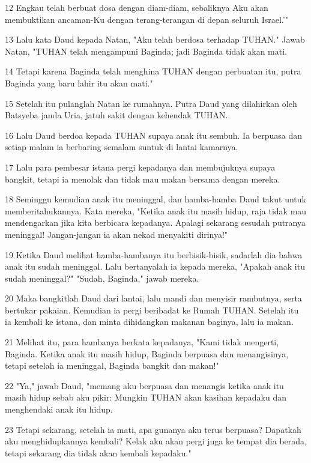 \par 12 Engkau telah berbuat dosa dengan diam-diam, sebaliknya Aku akan membuktikan ancaman-Ku dengan terang-terangan di depan seluruh Israel.'"
\par 13 Lalu kata Daud kepada Natan, "Aku telah berdosa terhadap TUHAN." Jawab Natan, "TUHAN telah mengampuni Baginda; jadi Baginda tidak akan mati.
\par 14 Tetapi karena Baginda telah menghina TUHAN dengan perbuatan itu, putra Baginda yang baru lahir itu akan mati."
\par 15 Setelah itu pulanglah Natan ke rumahnya. Putra Daud yang dilahirkan oleh Batsyeba janda Uria, jatuh sakit dengan kehendak TUHAN.
\par 16 Lalu Daud berdoa kepada TUHAN supaya anak itu sembuh. Ia berpuasa dan setiap malam ia berbaring semalam suntuk di lantai kamarnya.
\par 17 Lalu para pembesar istana pergi kepadanya dan membujuknya supaya bangkit, tetapi ia menolak dan tidak mau makan bersama dengan mereka.
\par 18 Seminggu kemudian anak itu meninggal, dan hamba-hamba Daud takut untuk memberitahukannya. Kata mereka, "Ketika anak itu masih hidup, raja tidak mau mendengarkan jika kita berbicara kepadanya. Apalagi sekarang sesudah putranya meninggal! Jangan-jangan ia akan nekad menyakiti dirinya!"
\par 19 Ketika Daud melihat hamba-hambanya itu berbisik-bisik, sadarlah dia bahwa anak itu sudah meninggal. Lalu bertanyalah ia kepada mereka, "Apakah anak itu sudah meninggal?" "Sudah, Baginda," jawab mereka.
\par 20 Maka bangkitlah Daud dari lantai, lalu mandi dan menyisir rambutnya, serta bertukar pakaian. Kemudian ia pergi beribadat ke Rumah TUHAN. Setelah itu ia kembali ke istana, dan minta dihidangkan makanan baginya, lalu ia makan.
\par 21 Melihat itu, para hambanya berkata kepadanya, "Kami tidak mengerti, Baginda. Ketika anak itu masih hidup, Baginda berpuasa dan menangisinya, tetapi setelah ia meninggal, Baginda bangkit dan makan!"
\par 22 "Ya," jawab Daud, "memang aku berpuasa dan menangis ketika anak itu masih hidup sebab aku pikir: Mungkin TUHAN akan kasihan kepadaku dan menghendaki anak itu hidup.
\par 23 Tetapi sekarang, setelah ia mati, apa gunanya aku terus berpuasa? Dapatkah aku menghidupkannya kembali? Kelak aku akan pergi juga ke tempat dia berada, tetapi sekarang dia tidak akan kembali kepadaku."
